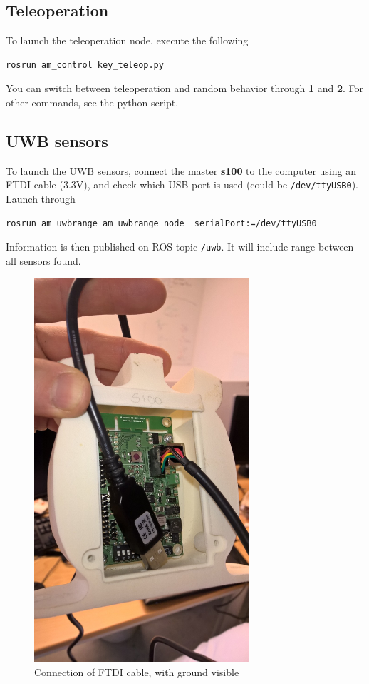 \documentclass[]{article}
\begin{document}
\subsection{Teleoperation}\label{sec:run_teleop}
To launch the teleoperation node, execute the following
\begin{verbatim}
rosrun am_control key_teleop.py
\end{verbatim}
You can switch between teleoperation and random behavior through \textbf{1} and \textbf{2}. For other commands, see the python script.

\subsection{UWB sensors}
To launch the UWB sensors, connect the master \textbf{s100} to the computer using an FTDI cable (3.3V), and check which USB port is used (could be \verb|/dev/ttyUSB0|). Launch through
\begin{verbatim}
rosrun am_uwbrange am_uwbrange_node _serialPort:=/dev/ttyUSB0
\end{verbatim}
Information is then published on ROS topic \verb|/uwb|. It will include range between all sensors found.
\begin{figure}[h]
\includegraphics[width=8cm, angle=270]{uwb.jpg}
\centering
\caption{Connection of FTDI cable, with ground visible}
\end{figure}
\end{document}
